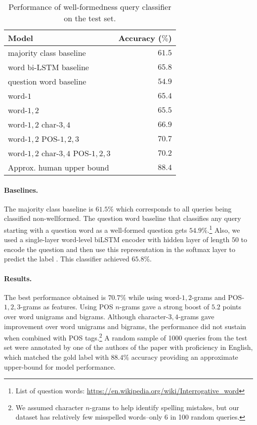 \documentclass[11pt,a4paper]{article}
\begin{document}
\begin{table}[!tb]
  \centering
  \begin{tabular}{|lr|}
  \hline
  Model & Accuracy ($\%$)\\
  \hline
  majority class baseline & $61.5$ \\
word bi-LSTM baseline & $65.8$ \\
  question word baseline & $54.9$\\
  \hline
  word-$1$ & $65.4$\\
  word-$1,2$ & $65.5$\\
  word-$1,2$ char-$3,4$ & $66.9$\\
  word-$1,2$ POS-$1,2,3$ & $\mathbf{70.7}$\\
  word-$1,2$ char-$3,4$ POS-$1,2,3$ & $70.2$\\
  \hline
  Approx. human upper bound & $88.4$\\
  \hline
  \end{tabular}
  \caption{Performance of well-formedness query classifier on the test set.}
  \label{tab:results}
\end{table}

\paragraph{Baselines.} The majority class baseline is $61.5\%$ which corresponds to all
queries being classified non-wellformed. The question word baseline that classifies any
query starting with a question word as a well-formed question gets
$54.9\%$.\footnote{List of question words: \url{https://en.wikipedia.org/wiki/Interrogative_word}} Also, we
used a single-layer word-level biLSTM encoder with hidden layer of length $50$
to encode the question and then use this representation in the softmax layer to
predict the label \cite{lee-dernoncourt:2016:N16-1}. This classifier achieved
$65.8\%$.

\paragraph{Results.} The best performance obtained is $70.7\%$ while
using word-$1,2$-grams and POS-$1,2,3$-grams as features. Using
POS $n$-grams gave a strong boost of $5.2$ points over word unigrams and bigrams.
Although character-$3,4$-grams gave improvement over word unigrams and bigrams,
the performance did not sustain when combined with POS tags.\footnote{We
assumed character $n$-grams to help identify spelling mistakes, but our dataset
has relatively few misspelled words--only 6 in 100 random queries.} A random sample of
1000 queries from the test set were annotated by one of the authors
of the paper with proficiency in English, which matched the gold label with
$88.4\%$ accuracy providing an approximate upper-bound for model performance.
\end{document}
